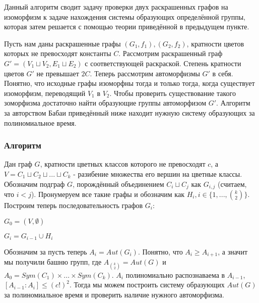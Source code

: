 Данный алгоритм сводит задачу проверки двух раскрашенных графов на изоморфизм к задаче нахождения системы образующих определённой группы, которая затем решается с помощью теории приведённой в предыдущем пункте.

Пусть нам даны раскрашенные графы $(G_1, f_1), (G_2, f_2)$, кратности цветов которых не превосходят константы $C$. Рассмотрим раскрашенный граф $G'=(V_1 \sqcup V_2, E_1 \sqcup E_2)$ с соответствующей раскраской. Степень кратности цветов $G'$ не превышает $2C$. Теперь рассмотрим автоморфизмы $G'$ в себя. Понятно, что исходные графы изоморфны тогда и только тогда, когда существует изоморфизм, переводящий $V_1$ в $V_2$. Чтобы проверить существование такого зоморфизма достаточно найти образующие группы автоморфизом $G'$. Алгоритм за авторством Бабаи приведённый ниже находит нужную систему образующих за полиномиальное время.

\subsubsection*{Алгоритм}

Дан граф $G$, кратности цветных классов которого не превосходят $c$, а $V = C_1 \sqcup C_2 \sqcup ... \sqcup C_k$ - разибение множества его вершин на цветные классы. Обозначим подграф $G$, порождённый объединением $C_i \sqcup C_j$ как $G_{i,j}$ (считаем, что $i < j$). Пронумеруем все такие графы и обозначим как $H_i, i \in \{1, ..., \binom{k}{2}\}$. Построим теперь последовательность графов $G_i$:
    
$G_0 = (V, \emptyset)$

$G_i = G_{i-1} \cup H_i$

Обозначим за пусть теперь $A_i = Aut(G_i)$. Понятно, что $A_i \geqslant A_{i + 1}$, а значит мы получили башню групп, где $A_{\binom{k}{2}} = Aut(G)$ и $A_0 = Sym(C_1) \times ... \times Sym(C_k)$. $A_i$ полиномиально распознаваема в $A_{i-1}$, $[A_{i-1}:A_i] \leqslant (c!)^2$. Тогда мы можем построить систему образующих $Aut(G)$ за полиномиальное время и проверить наличие нужного автоморфизма.